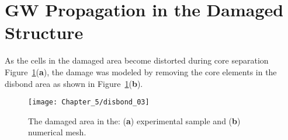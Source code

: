 \section{GW Propagation in the Damaged Structure}
\label{sec:disbond}

As the cells in the damaged area become distorted during core separation Figure~\ref{fig:disbond}(\textbf{a}), %
the damage was modeled by removing the core elements in the disbond area as shown in Figure~\ref{fig:disbond}(\textbf{b}).
\begin{figure}[H]
	\texttt{[image: Chapter\_5/disbond\_03]}
	\caption{The damaged area in the: (\textbf{a}) experimental sample and (\textbf{b}) numerical mesh.}
	\label{fig:disbond}
\end{figure}